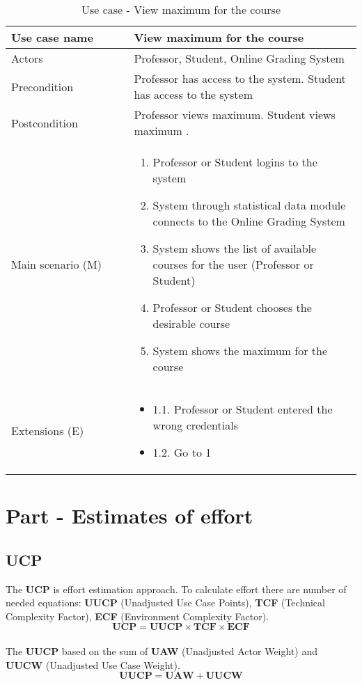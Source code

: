 \documentclass[12pt]{article}
\newcommand\tabularhead[1]{
\begin{table}[h]
  \caption{Use case - #1}
  \begin{tabular}{|p{0.35\linewidth}|p{0.65\linewidth}|}
    \hline
    \textbf{Use case name} & \textbf{#1} \\
    \hline}
\newcommand\addrow[2]{#1 &#2\\ \hline}
\newcommand\adddoublerow[2]{\begin{minipage}[t][][t]{2.5cm}#1\end{minipage}%
    &\begin{minipage}[t][][t]{\linewidth}
     \begin{itemize}\setlength{\itemsep}{0pt}%
        #2     
     \end{itemize}
     \end{minipage}\\ \hline}
\newcommand\addmulrow[2]{ \begin{minipage}[t][][t]{2.5cm}#1\end{minipage}%
     &\begin{minipage}[t][][t]{\linewidth}
      \begin{enumerate}\setlength{\itemsep}{0pt}%
        #2   
      \end{enumerate}
      \end{minipage}\\ \hline}
\newenvironment{usecase}{\tabularhead}
{\hline\end{tabular}\end{table}}
\begin{document}
\begin{usecase}{View maximum for the course}
    \addrow{Actors}{Professor, Student, Online Grading System}
    \addrow{Precondition}{Professor has access to the system. Student has access to the system}
    \addrow{Postcondition}{Professor views maximum. Student views maximum .}
    \addmulrow{Main scenario (M)}{
        \item Professor or Student logins to the system
        \item System through statistical data module connects to the Online Grading System
        \item System shows the list of available courses for the user (Professor or Student)
        \item Professor or Student chooses the desirable course
        \item System shows the maximum for the course
    }
    \adddoublerow{Extensions (E)}{
        \item[] 1.1. Professor or Student entered the wrong credentials
        \item[] 1.2. Go to 1
    }
\end{usecase}
\newpage
\section{Part - Estimates of effort}
\subsection{UCP}
The \textbf{UCP} is effort estimation approach. To calculate effort there are number of needed equations: \textbf{UUCP} (Unadjusted Use Case Points), \textbf{TCF} (Technical Complexity Factor), \textbf{ECF} (Environment Complexity Factor). \\
\begin{equation}
    \textbf{UCP} = \textbf{UUCP} \times \textbf{TCF} \times \textbf{ECF}
\end{equation}\\

The \textbf{UUCP} based on the sum of \textbf{UAW} (Unadjusted Actor Weight)
and \textbf{UUCW} (Unadjusted Use Case Weight).\\
\begin{equation}
    \textbf{UUCP} = \textbf{UAW} + \textbf{UUCW}
\end{equation}\\
\end{document}
